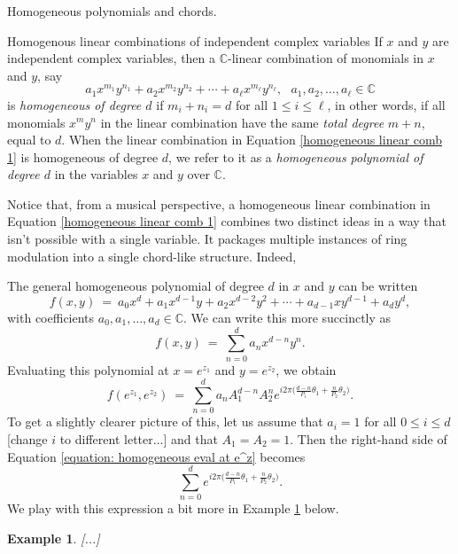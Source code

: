 \documentclass[letterpaper,11pt, reqno]{amsart}
\newtheorem{monodromy theorem}{Monodromy Theorem}[subsection]
\newtheorem{wild conjecture}[theorem]{Wild Conjecture}
\newtheorem{research objectives}{Research objectives}[subsection]
\newtheorem{research question}[theorem]{Research questions}
\newtheorem{aside question}[theorem]{Aside question}
\newtheorem{example}[theorem]{Example}
\newtheorem{audio example}[theorem]{\loudspeaker[3] Example}
\newtheorem{blank remark}[theorem]{}
\newtheorem{terminology and comment}[theorem]{Terminology and comment}
\newtheorem{purity hypothesis}[theorem]{Purity hypothesis}
\newtheorem{corollary of the purity hypothesis}[theorem]{Corollary of the purity hypothesis}
\newcommand{\CC} {{\mathbb C}}
\numberwithin{equation}{theorem}
\begin{document}
\begin{section}{Homogeneous polynomials and chords.}
\begin{subsection}{Homogenous linear combinations of independent complex variables}
If $x$ and $y$ are independent complex variables, then a $\CC$-linear combination of monomials in $x$ and $y$, say
	\begin{equation}\label{homogeneous linear comb 1}
	a_{1}x^{m_1}y^{n_1}
	+
	a_{2}x^{m_2}y^{n_2}
	+
	\cdots
	+
	a_{\ell}x^{m_\ell}y^{n_\ell},
	\ \ \ a_1,a_2,\dots,a_\ell\in\CC
	\end{equation}
is {\em homogeneous of degree $d$} if $m_i+n_i=d$ for all $1\le i\le \ell$, in other words, if all monomials $x^my^n$ in the linear combination have the same {\em total degree} $m+n$, equal to $d$. When the linear combination in Equation \eqref{homogeneous linear comb 1} is homogeneous of degree $d$, we refer to it as a {\em homogeneous polynomial of degree $d$} in the variables $x$ and $y$ over $\CC$.

Notice that, from a musical perspective, a homogeneous linear combination in Equation \eqref{homogeneous linear comb 1} combines two distinct ideas in a way that isn't possible with a single variable. It packages multiple instances of ring modulation into a single chord-like structure. Indeed, 

The general homogeneous polynomial of degree $d$ in $x$ and $y$ can be written
	$$
	f(x,y)
	\ =\ 
	a_{0}x^d+a_1x^{d-1}y+a_2x^{d-2}y^2+\cdots+a_{d-1}xy^{d-1}+a_{d}y^d,
	$$
with coefficients $a_0,a_1,\dots,a_d\in\CC$. We can write this more succinctly as
	$$
	f(x,y)
	\ =\ 
	\sum_{n=0}^{d}a_nx^{d-n}y^n.
	$$
Evaluating this polynomial at $x=e^{z_1}$ and $y=e^{z_2}$, we obtain
	\begin{equation}\label{equation: homogeneous eval at e^z}
	f(e^{z_1},e^{z_2})
	\ =\ 
	\sum_{n=0}^{d}a_{n}A_{1}^{d-n}A_{2}^{n}e^{i2\pi\big(\tfrac{d-n}{P_1}\theta_1+\tfrac{n}{P_2}\theta_2\big)}.
	\end{equation}
To get a slightly clearer picture of this, let us assume that $a_i=1$ for all $0\le i\le d$ {\color{red} [change $i$ to different letter...]} and that $A_1=A_2=1$. Then the right-hand side of Equation \eqref{equation: homogeneous eval at e^z} becomes
	\begin{equation}\label{equation: all amplitudes =1}
	\sum_{n=0}^{d}e^{i2\pi\big(\tfrac{d-n}{P_1}\theta_1+\tfrac{n}{P_2}\theta_2\big)}.
	\end{equation}
We play with this expression a bit more in Example \ref{example: relationship to standard chords} below.

\begin{example}\label{example: relationship to standard chords}
\normalfont
{\color{red} [...]}


\end{example}
\end{subsection}
\end{section}
\end{document}
